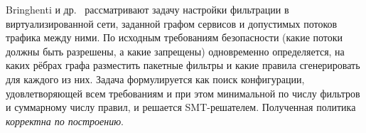 Bringhenti и др.~\cite{bringhenti2022automated} рассматривают задачу настройки фильтрации в виртуализированной сети, заданной графом сервисов и допустимых потоков трафика между ними. По исходным требованиям безопасности (какие потоки должны быть разрешены, а какие запрещены) одновременно определяется, на каких рёбрах графа разместить пакетные фильтры и какие правила сгенерировать для каждого из них. Задача формулируется как поиск конфигурации, удовлетворяющей всем требованиям и при этом минимальной по числу фильтров и суммарному числу правил, и решается SMT-решателем. Полученная политика \emph{корректна по построению}.

\newpage
